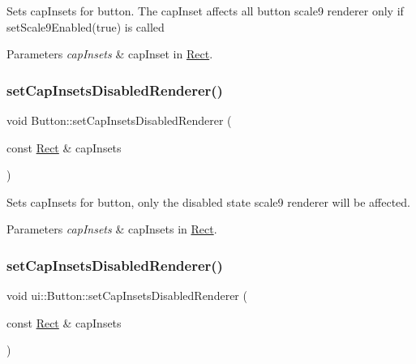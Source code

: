 Sets cap\+Insets for button. The cap\+Inset affects all button scale9 renderer only if {\ttfamily set\+Scale9\+Enabled(true)} is called


\begin{DoxyParams}{Parameters}
{\em cap\+Insets} & cap\+Inset in \hyperlink{classRect}{Rect}. \\
\hline
\end{DoxyParams}
\mbox{\label{classui_1_1Button_a98979d3dc729cf433cecc48fcc988d58}} 
\subsubsection{\texorpdfstring{set\+Cap\+Insets\+Disabled\+Renderer()}{setCapInsetsDisabledRenderer()}\hspace{0.1cm}{\footnotesize\ttfamily [1/2]}}
{\footnotesize\ttfamily void Button\+::set\+Cap\+Insets\+Disabled\+Renderer (\begin{DoxyParamCaption}\item[{const \hyperlink{classRect}{Rect} \&}]{cap\+Insets }\end{DoxyParamCaption})}

Sets cap\+Insets for button, only the disabled state scale9 renderer will be affected.


\begin{DoxyParams}{Parameters}
{\em cap\+Insets} & cap\+Insets in \hyperlink{classRect}{Rect}. \\
\hline
\end{DoxyParams}
\mbox{\label{classui_1_1Button_ae63d7927037aa4cac87e07d526c0bbfe}} 
\subsubsection{\texorpdfstring{set\+Cap\+Insets\+Disabled\+Renderer()}{setCapInsetsDisabledRenderer()}\hspace{0.1cm}{\footnotesize\ttfamily [2/2]}}
{\footnotesize\ttfamily void ui\+::\+Button\+::set\+Cap\+Insets\+Disabled\+Renderer (\begin{DoxyParamCaption}\item[{const \hyperlink{classRect}{Rect} \&}]{cap\+Insets }\end{DoxyParamCaption})}

